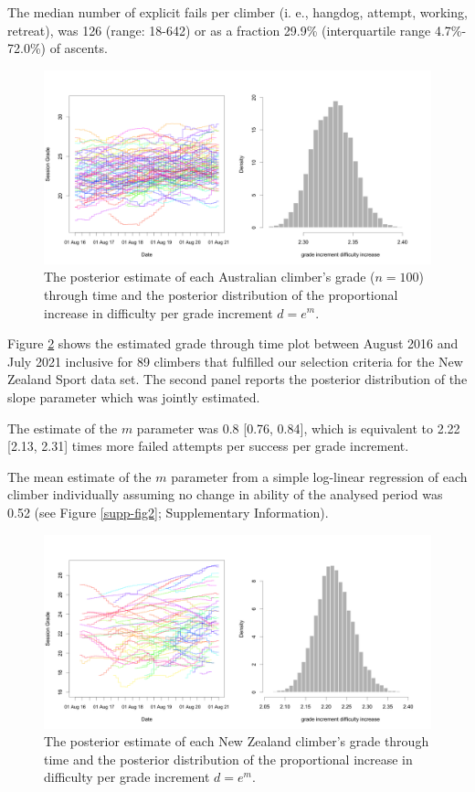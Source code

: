 \documentclass{article}
\begin{document}
{The median number of explicit fails per climber (i. e., \gls{hangdog}, attempt, working, retreat), was 126 (range: 18-642) or as a fraction 29.9\% (interquartile range 4.7\%- 72.0\%) of ascents.
\begin{figure}
\centering
\includegraphics[width=\textwidth]{../results/aus/ascents-from-2016-08-01-to-2021-08-01-minAscents30-minFails1-Sport-AU-session-posterior.png}
\caption{\small The posterior estimate of each Australian climber's grade ($n=100$) through time and the posterior distribution of the proportional increase in difficulty per grade increment $d = e^m$.}
\label{aus_ascents}
\end{figure}

Figure \ref{nz_ascents} shows the estimated grade through time plot between August 2016 and July 2021 inclusive for 89 climbers that fulfilled our selection criteria for the New Zealand Sport data set. The second panel reports the posterior distribution of the slope parameter which was jointly estimated.

The estimate of the $m$ parameter was 0.8 [0.76, 0.84], which is equivalent to 2.22 [2.13, 2.31] times more failed attempts per success per grade increment. 

The mean estimate of the $m$ parameter from a simple log-linear regression of each climber individually assuming no change in ability of the analysed period was 0.52 (see Figure \ref{supp-fig2}; Supplementary Information). 


\begin{figure}
\centering
\includegraphics[width=\textwidth]{../results/nz/ascents-from-2016-08-01-to-2021-08-01-minAscents30-minFails1-Sport-AU-session-posterior.png}
\caption{\small The posterior estimate of each New Zealand climber's grade through time and the posterior distribution of the proportional increase in difficulty per grade increment $d = e^m$.}
\label{nz_ascents}
\end{figure}


}
\end{document}
